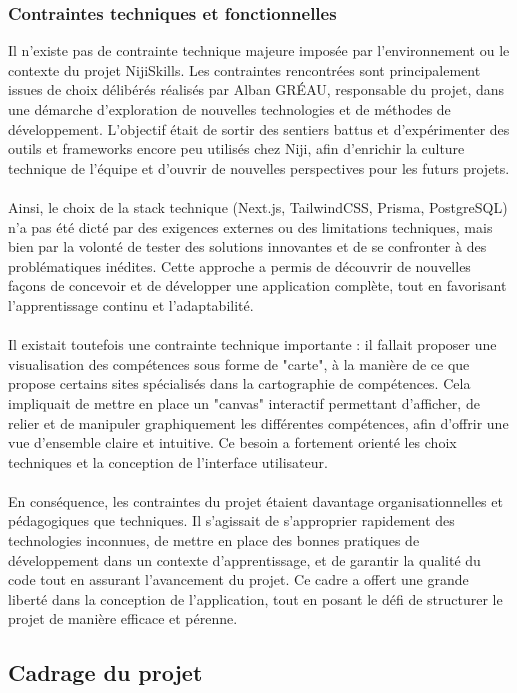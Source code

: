 \documentclass[12pt]{article}
\begin{document}
\subsubsection{Contraintes techniques et fonctionnelles}
Il n’existe pas de contrainte technique majeure imposée par l'environnement ou le contexte du projet NijiSkills. Les contraintes rencontrées sont principalement issues de choix délibérés réalisés par Alban GRÉAU, responsable du projet, dans une démarche d'exploration de nouvelles technologies et de méthodes de développement. L’objectif était de sortir des sentiers battus et d’expérimenter des outils et frameworks encore peu utilisés chez Niji, afin d’enrichir la culture technique de l’équipe et d’ouvrir de nouvelles perspectives pour les futurs projets.
\\\\
Ainsi, le choix de la stack technique (Next.js, TailwindCSS, Prisma, PostgreSQL) n’a pas été dicté par des exigences externes ou des limitations techniques, mais bien par la volonté de tester des solutions innovantes et de se confronter à des problématiques inédites. Cette approche a permis de découvrir de nouvelles façons de concevoir et de développer une application complète, tout en favorisant l’apprentissage continu et l’adaptabilité.
\\\\
Il existait toutefois une contrainte technique importante : il fallait proposer une visualisation des compétences sous forme de "carte", à la manière de ce que propose certains sites spécialisés dans la cartographie de compétences. Cela impliquait de mettre en place un "canvas" interactif permettant d’afficher, de relier et de manipuler graphiquement les différentes compétences, afin d’offrir une vue d’ensemble claire et intuitive. Ce besoin a fortement orienté les choix techniques et la conception de l’interface utilisateur.
\\\\
En conséquence, les contraintes du projet étaient davantage organisationnelles et pédagogiques que techniques. Il s’agissait de s’approprier rapidement des technologies inconnues, de mettre en place des bonnes pratiques de développement dans un contexte d’apprentissage, et de garantir la qualité du code tout en assurant l’avancement du projet. Ce cadre a offert une grande liberté dans la conception de l’application, tout en posant le défi de structurer le projet de manière efficace et pérenne.
\subsection{Cadrage du projet}
\end{document}

